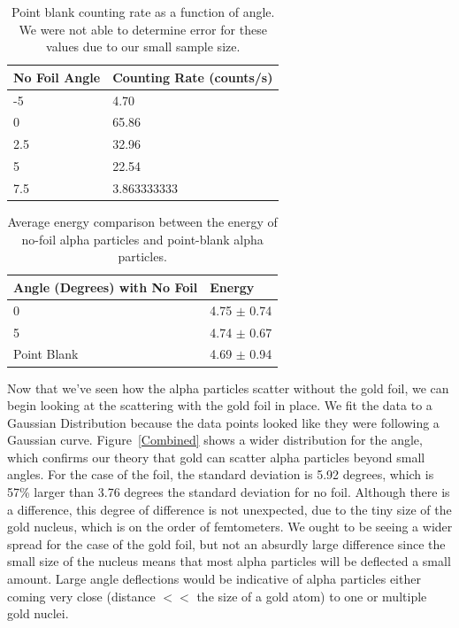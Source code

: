 \begin{table}[h]
  \begin{tabular}{|l|l|}
  \hline
  No Foil Angle & Counting Rate (counts/s) \\ \hline \hline
  -5            & 4.70                          \\
  0             & 65.86                         \\
  2.5           & 32.96                         \\
  5             & 22.54                         \\
  7.5           & 3.863333333                   \\ \hline
  \end{tabular}
  \caption{Point blank counting rate as a function of angle. We were not able to determine error for these values due to our small sample size.}
  \label{NoFoilTable}
\end{table}

\begin{table}[h]
  \begin{tabular}{|l|l|}
  \hline
  Angle (Degrees) with No Foil & Energy    \\ \hline \hline
  0               & 4.75 $\pm$ 0.74        \\
  5               & 4.74 $\pm$ 0.67        \\
  Point Blank     & 4.69 $\pm$ 0.94        \\ \hline
  \end{tabular}
  \caption{Average energy comparison between the energy of no-foil alpha particles and point-blank alpha particles.}
  \label{Energies}
\end{table}

Now that we've seen how the alpha particles scatter without the gold foil, we can begin looking at the scattering with the gold foil in place. We fit the data to a Gaussian Distribution because the data points looked like they were following a Gaussian curve. Figure~\ref{Combined} shows a wider distribution for the angle, which confirms our theory that gold can scatter alpha particles beyond small angles. For the case of the foil, the standard deviation is 5.92 degrees, which is 57\% larger than 3.76 degrees the standard deviation for no foil. Although there is a difference, this degree of difference is not unexpected, due to the tiny size of the gold nucleus, which is on the order of femtometers. We ought to be seeing a wider spread for the case of the gold foil, but not an absurdly large difference since the small size of the nucleus means that most alpha particles will be deflected a small amount. Large angle deflections would be indicative of alpha particles either coming very close (distance $<<$ the size of a gold atom) to one or multiple gold nuclei. 

